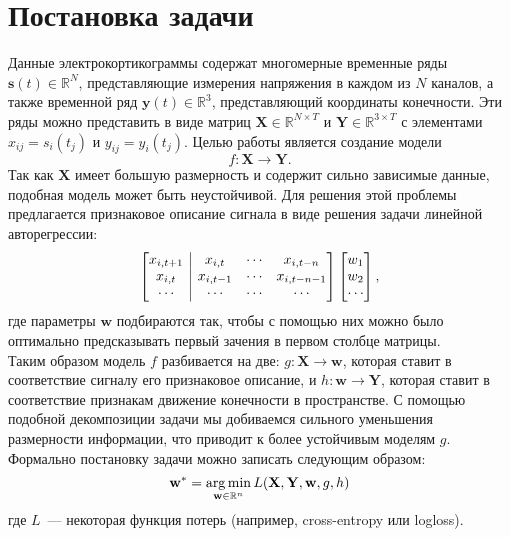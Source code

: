 \documentclass[12pt,twoside]{article}
\begin{document}
\section{Постановка задачи}
Данные электрокортикограммы содержат многомерные временные ряды $\mathbf{s}(t) \in \mathbb{R}^{N}$, представляющие измерения напряжения в каждом из $N$ каналов, а также временной ряд $\mathbf{y}(t) \in \mathbb{R}^3$, представляющий координаты конечности. Эти ряды можно представить в виде матриц $\mathbf{X} \in \mathbb{R}^{N \times T}$ и $\mathbf{Y} \in \mathbb{R}^{3 \times T}$ с элементами $x_{ij} = s_i(t_j)$ и $y_{ij} = y_i(t_j)$. Целью работы является создание модели
\[
    f: \mathbf{X} \to \mathbf{Y}.
\]
Так как $\mathbf{X}$ имеет большую размерность и содержит сильно зависимые данные, подобная модель может быть неустойчивой. Для решения этой проблемы предлагается признаковое описание сигнала в виде решения задачи линейной авторегрессии:
\[
    \left[\begin{array}{@{}c|ccc@{}}
        x_{i, t+1} & x_{i, t}   & \cdots & x_{i, t-n}   \\
        x_{i, t}   & x_{i, t-1} & \cdots & x_{i, t-n-1} \\
        \cdots     & \cdots     & \cdots & \cdots
    \end{array}\right]
    \begin{bmatrix}
        w_1 \\
        w_2 \\
        \cdots
    \end{bmatrix},
\]
где параметры $\mathbf{w}$ подбираются так, чтобы с помощью них можно было оптимально предсказывать первый зачения в первом столбце матрицы.\\
Таким образом модель $f$ разбивается на две: $g: \mathbf{X} \to \mathbf{w}$, которая ставит в соответствие сигналу его признаковое описание, и $h: \mathbf{w} \to \mathbf{Y}$, которая ставит в соответствие признакам движение конечности в пространстве. С помощью подобной декомпозиции задачи мы добиваемся сильного уменьшения размерности информации, что приводит к более устойчивым моделям $g$.\\
Формально постановку задачи можно записать следующим образом:
\[
    \mathbf{w}^* = \argmin_{\mathbf{w} \in \mathbb{R}^n} L(\mathbf{X}, \mathbf{Y}, \mathbf{w}, g, h)
\]
где $L$~--- некоторая функция потерь (например, cross-entropy или logloss).



\end{document}
